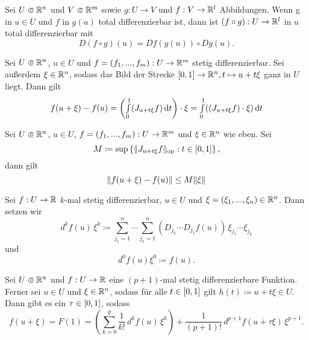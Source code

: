 \documentclass{cheat-sheet}
\begin{document}
\begin{satz}[Kettenregel]
  Sei $U \opn \R^n$ und $V \opn \R^m$ sowie $g : U \to V$ und $f : V \to \mathbb{R}^l$ Abbildungen. Wenn g in $u \in U$ und $f$ in $g(u)$ total differenzierbar ist, dann ist $(f \circ g) : U \to \mathbb{R}^l$ in $u$ total differenzierbar mit
  \[ D(f \circ g)(u) = D f(g(u)) \circ D g(u). \]
\end{satz}


\begin{satz}[MWS]
  Sei $U \opn \R^n$, $u \in U$ und $f = (f_1, ..., f_m) : U \to \mathbb{R}^m$ stetig differenzierbar. Sei außerdem $\xi \in \mathbb{R}^n$, sodass das Bild der Strecke $\left[ 0, 1 \right] \to \mathbb{R}^n, t \mapsto u + t \xi$ ganz in $U$ liegt. Dann gilt
  \[ f(u + \xi) - f(u) = \left( {\textstyle \int\limits_{0}^{1}} (J_{u + t \xi} f) \,\mathrm{d} t \right) \cdot \xi = {\textstyle \int\limits_{0}^{1}} ((J_{u + t \xi} f) \cdot \xi) \,\mathrm{d} t \]
\end{satz}

\begin{kor}[Schrankensatz]
  Sei $U \opn \R^n$, $u \in U$, $f = (f_1, ..., f_m) : U \to \mathbb{R}^m$ und $\xi \in \mathbb{R}^n$ wie eben. Sei
  \[ M \coloneqq \sup \left\{ \lVert J_{u + t \xi} f\rVert_{\text{op}} : t \in \left[ 0, 1 \right] \right\}, \]
  dann gilt
  \[ \lVert f(u + \xi) - f(u)\rVert \le M \lVert\xi\rVert \]
\end{kor}

\begin{nota}
  Sei $f : U \to \mathbb{R}$ $k$-mal stetig differenzierbar, $u \in U$ und $\xi = (\xi_1, ..., \xi_n) \in \mathbb{R}^n$. Dann setzen wir
  \[ d^k f(u)\,\xi^k \coloneqq \sum_{j_1=1}^n \cdots \sum_{j_k=1}^n (D_{j_k} \cdots D_{j_1} f(u))\,\xi_{j_1}\cdots\xi_{j_k} \]
  und
  \[ d^0 f(u) \xi^0 \coloneqq f(u). \]
\end{nota}

\begin{satz}
  Sei $U \opn \R^n$ und $f : U \to \mathbb{R}$ eine $(p + 1)$-mal stetig differenzierbare Funktion. Ferner sei $u \in U$ und $\xi \in \mathbb{R}^n$, sodass für alle $t \in \left[ 0, 1 \right]$ gilt $h(t) \coloneqq u + t \xi \in U$. Dann gibt es ein $\tau \in \left[ 0, 1 \right]$, sodass
  \[ f(u + \xi) = F(1) = \left( \sum_{k=0}^{p} \frac{1}{k!}\,d^k f(u)\,\xi^k \right) + \frac{1}{(p + 1)!}\,d^{p+1} f(u + \tau \xi)\,\xi^{p+1}. \]
\end{satz}
\end{document}
